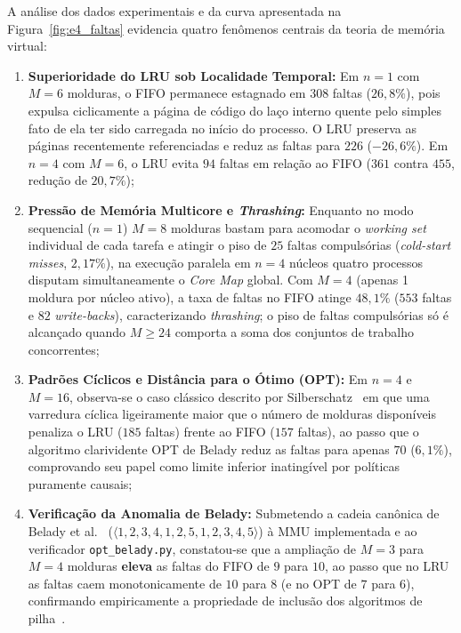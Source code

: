 \documentclass[conference]{IEEEtran}
\begin{document}
A análise dos dados experimentais e da curva apresentada na Figura~\ref{fig:e4_faltas} evidencia quatro fenômenos centrais da teoria de memória virtual:
\begin{enumerate}
    \item \textbf{Superioridade do LRU sob Localidade Temporal:} Em $n = 1$ com $M = 6$ molduras, o FIFO permanece estagnado em $308$ faltas ($26,8\%$), pois expulsa ciclicamente a página de código do laço interno quente pelo simples fato de ela ter sido carregada no início do processo. O LRU preserva as páginas recentemente referenciadas e reduz as faltas para $226$ ($-26,6\%$). Em $n = 4$ com $M = 6$, o LRU evita $94$ faltas em relação ao FIFO ($361$ contra $455$, redução de $20,7\%$);
    \item \textbf{Pressão de Memória Multicore e \textit{Thrashing}:} Enquanto no modo sequencial ($n = 1$) $M = 8$ molduras bastam para acomodar o \textit{working set}~\cite{denning1968} individual de cada tarefa e atingir o piso de $25$ faltas compulsórias (\textit{cold-start misses}, $2,17\%$), na execução paralela em $n = 4$ núcleos quatro processos disputam simultaneamente o \textit{Core Map} global. Com $M = 4$ (apenas 1 moldura por núcleo ativo), a taxa de faltas no FIFO atinge $48,1\%$ ($553$ faltas e $82$ \textit{write-backs}), caracterizando \textit{thrashing}; o piso de faltas compulsórias só é alcançado quando $M \ge 24$ comporta a soma dos conjuntos de trabalho concorrentes;
    \item \textbf{Padrões Cíclicos e Distância para o Ótimo (OPT):} Em $n = 4$ e $M = 16$, observa-se o caso clássico descrito por Silberschatz~\cite{silberschatz2018} em que uma varredura cíclica ligeiramente maior que o número de molduras disponíveis penaliza o LRU ($185$ faltas) frente ao FIFO ($157$ faltas), ao passo que o algoritmo clarividente OPT de Belady reduz as faltas para apenas $70$ ($6,1\%$), comprovando seu papel como limite inferior inatingível por políticas puramente causais;
    \item \textbf{Verificação da Anomalia de Belady:} Submetendo a cadeia canônica de Belady et al.~\cite{belady1969} ($\langle 1,2,3,4,1,2,5,1,2,3,4,5 \rangle$) à MMU implementada e ao verificador \texttt{opt\_belady.py}, constatou-se que a ampliação de $M = 3$ para $M = 4$ molduras \textbf{eleva} as faltas do FIFO de $9$ para $10$, ao passo que no LRU as faltas caem monotonicamente de $10$ para $8$ (e no OPT de $7$ para $6$), confirmando empiricamente a propriedade de inclusão dos algoritmos de pilha~\cite{mattson1970}.
\end{enumerate}
\end{document}
